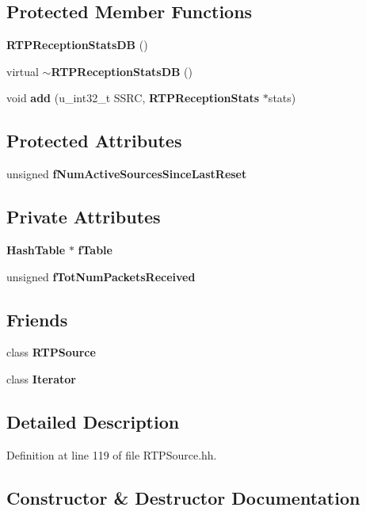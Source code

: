 \subsection*{Protected Member Functions}
\begin{DoxyCompactItemize}
\item 
{\bf R\+T\+P\+Reception\+Stats\+D\+B} ()
\item 
virtual {\bf $\sim$\+R\+T\+P\+Reception\+Stats\+D\+B} ()
\item 
void {\bf add} (u\+\_\+int32\+\_\+t S\+S\+R\+C, {\bf R\+T\+P\+Reception\+Stats} $\ast$stats)
\end{DoxyCompactItemize}
\subsection*{Protected Attributes}
\begin{DoxyCompactItemize}
\item 
unsigned {\bf f\+Num\+Active\+Sources\+Since\+Last\+Reset}
\end{DoxyCompactItemize}
\subsection*{Private Attributes}
\begin{DoxyCompactItemize}
\item 
{\bf Hash\+Table} $\ast$ {\bf f\+Table}
\item 
unsigned {\bf f\+Tot\+Num\+Packets\+Received}
\end{DoxyCompactItemize}
\subsection*{Friends}
\begin{DoxyCompactItemize}
\item 
class {\bf R\+T\+P\+Source}
\item 
class {\bf Iterator}
\end{DoxyCompactItemize}


\subsection{Detailed Description}


Definition at line 119 of file R\+T\+P\+Source.\+hh.



\subsection{Constructor \& Destructor Documentation}
